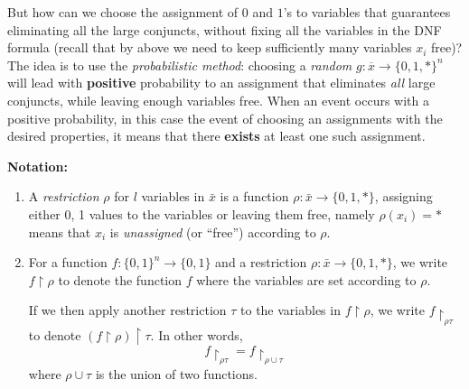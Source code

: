 But how can we choose the assignment of $0$ and $1$'s to variables that guarantees eliminating all the large conjuncts, without fixing all the variables in the DNF formula (recall that by  above we need to keep sufficiently many variables $x_i$ free)?
The idea is to use the \emph{probabilistic method}: choosing a \emph{random} $g: \overline x \to \{0,1, *\}^n$ will lead with \textbf{positive} probability to an assignment that eliminates \emph{all} large conjuncts, while leaving enough variables free. When an event occurs with a positive probability, in this case the event of choosing an assignments with the desired properties, it means that there \textbf{exists} at least one such assignment. 


\textbf{Notation:} 
\begin{enumerate}
\item 
 A \textit{restriction} $\rho$ for $l$ variables in $\bar{x}$ is a function $\rho: \bar{x} \to \{0,1, *\}$, assigning either 0, 1 values to the variables or leaving them free, namely $\rho(x_i) = *$ means that $x_i$ is \textit{unassigned} (or ``free'') according to $\rho$.

 
\item For a function $f: \{0,1\}^n \to \{0,1\}$ and a   restriction $\rho: \bar{x} \to \{0,1, *\}$, we write $f\upharpoonright \rho$ to denote the function $f$ where the variables are set according to $\rho$.

If we then apply another restriction $\tau$ to the variables in $f\upharpoonright \rho$, we 
write $f\upharpoonright_{\rho\tau}$ to denote $(f\upharpoonright \rho)\upharpoonright \tau$. In other words,
\[
f\upharpoonright_{\rho\tau} = f\upharpoonright_{\rho \cup \tau}
\]
where $\rho \cup \tau$ is the union of two functions.
\end{enumerate}



